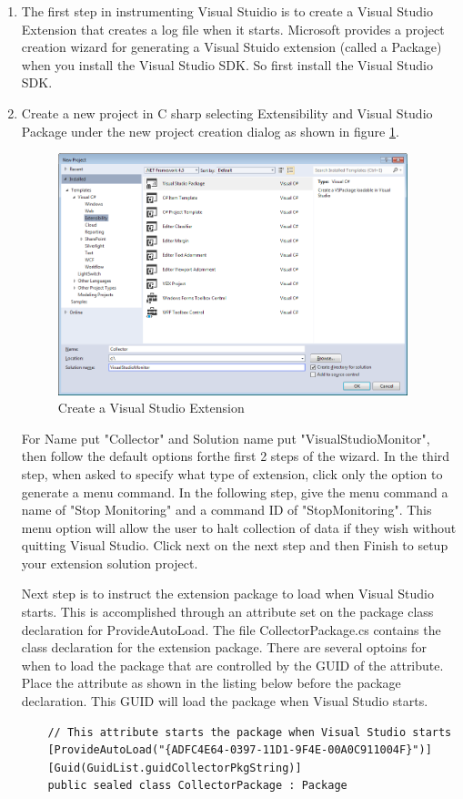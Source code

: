  \begin{Exercise}[type={program}, difficulty={1}]
\begin{enumerate}
\item
The first step in instrumenting Visual Stuidio is to create a Visual Studio Extension that creates a log file when it starts.   Microsoft provides a project creation wizard for generating a Visual Stuido extension (called a Package) when you install the Visual Studio SDK.  So first install the Visual Studio SDK.  

\item Create a new project in C sharp selecting Extensibility and Visual Studio Package under the new project creation dialog as shown in figure \ref{fig:ProjectCreation}.  
\begin{figure}
	\centering
	\includegraphics[width=4in]{Graphics/CreateVSIXExtension.png}
	\caption{Create a Visual Studio Extension}
	\label{fig:ProjectCreation}
\end{figure}

For Name put "Collector" and Solution name put "VisualStudioMonitor", then follow the default options forthe first 2 steps of the wizard.  In the third step, when asked to specify what type of extension, click only the option to generate a menu command.  In the following step, give the menu command a name of "Stop Monitoring" and a command ID of "StopMonitoring".  This menu option will allow the user to halt collection of data if they wish without quitting Visual Studio.  Click next on the next step and then Finish to setup your extension solution project.

Next step is to instruct the extension package to load when Visual Studio starts. This is accomplished through an attribute set on the package class declaration for ProvideAutoLoad.  The file CollectorPackage.cs contains the class declaration for the extension package.   There are several optoins for when to load the package that are controlled by the GUID of the attribute.  Place the attribute as shown in the listing below before the package declaration.  This GUID will load the package when Visual Studio starts.

\begin{lstlisting}
    // This attribute starts the package when Visual Studio starts 
    [ProvideAutoLoad("{ADFC4E64-0397-11D1-9F4E-00A0C911004F}")]
    [Guid(GuidList.guidCollectorPkgString)]
    public sealed class CollectorPackage : Package
\end{lstlisting}
\end{enumerate}
\end{Exercise}

